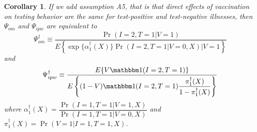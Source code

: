 \documentclass{article}
\newtheorem{corollary}{Corollary}
\begin{document}
\begin{corollary}
If we add assumption A5, that is that direct effects of vaccination on testing behavior are the same for test-positive and test-negative illnesses, then $\Psi_{om}$ and $\Psi_{ipw}$ are equivalent to
\begin{equation}
    \Psi^\dagger_{om} \equiv \dfrac{\Pr(I = 2, T = 1 | V = 1)}{E\left\{ \exp\{\alpha^\dagger_1(X)\} \Pr(I = 2, T = 1 | V = 0, X) \Big| V = 1 \right\}}
\end{equation}
and 
\begin{equation}
    \Psi^\dagger_{ipw} \equiv \dfrac{E\{V \mathbbm 1 (I = 2, T = 1)\}}{E\left\{ (1 - V) \mathbbm 1(I = 2, T = 1) \dfrac{\pi^\dagger_1(X)}{1 - \pi^\dagger_1(X)}\right\}}
\end{equation}
where $\alpha^\dagger_1(X) = \dfrac{\Pr(I = 1, T = 1 | V = 1, X)}{\Pr(I = 1, T = 1 | V = 0, X)}$ and $\pi^\dagger_1(X) = \Pr(V = 1| I = 1, T = 1, X)$.
\end{corollary}
\end{document}
